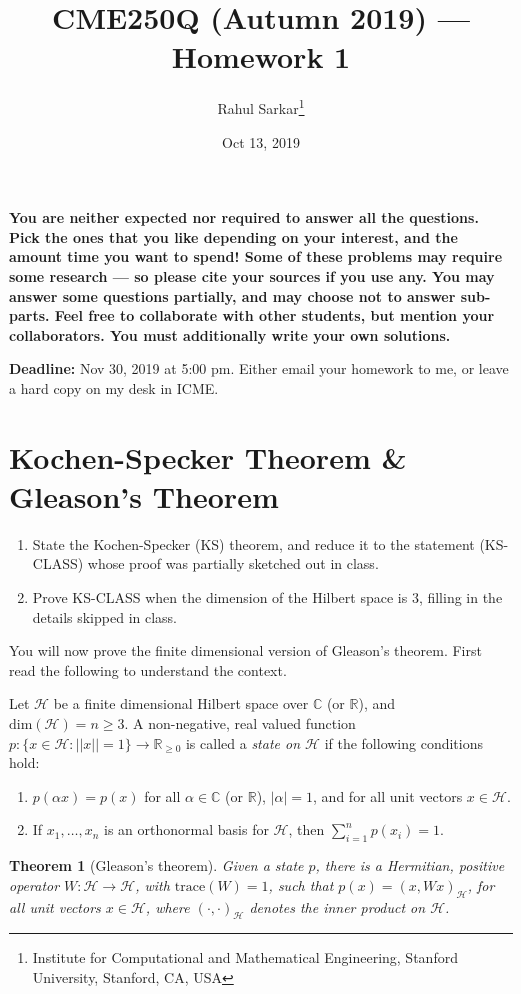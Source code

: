 \documentclass[10pt]{article}
\title{CME250Q (Autumn 2019) --- Homework 1}
\author{Rahul Sarkar\footnote{Institute for Computational and Mathematical Engineering, Stanford University, Stanford, CA, USA}}
\date{Oct 13, 2019}
\newcounter{ex}
\theoremstyle{plain}
\newtheorem{theorem}{Theorem}[section]
\theoremstyle{definition}
\begin{document}
\maketitle

\textbf{You are neither expected nor required to answer all the questions. Pick the ones that you like depending on your interest, and the amount time you want to spend! Some of these problems may require some research --- so please cite your sources if you use any. You may answer some questions partially, and may choose not to answer sub-parts. Feel free to collaborate with other students, but mention your collaborators. You must additionally write your own solutions.}

\textbf{Deadline:} Nov 30, 2019 at 5:00 pm. Either email your homework to me, or leave a hard copy on my desk in ICME.

\section{Kochen-Specker Theorem \& Gleason's Theorem}
\begin{enumerate}[label=(\alph*)]
\item State the Kochen-Specker (KS) theorem, and reduce it to the statement (KS-CLASS) whose proof was partially sketched out in class.
\item Prove KS-CLASS when the dimension of the Hilbert space is $3$, filling in the details skipped in class.
\end{enumerate}

You will now prove the finite dimensional version of Gleason's theorem. First read the following to understand the context.

Let $\mathcal{H}$ be a finite dimensional Hilbert space over $\mathbb{C}$ (or $\mathbb{R}$), and $\text{dim}(\mathcal{H}) = n \geq 3$. A non-negative, real valued function $p : \{x \in \mathcal{H}: ||x|| = 1\} \rightarrow \mathbb{R}_{\geq 0}$ is called a \textit{state on $\mathcal{H}$} if the following conditions hold:
\begin{enumerate}[label=(\roman*)]
\item $p(\alpha x) = p(x)$ for all $\alpha \in \mathbb{C}$ (or $\mathbb{R}$), $|\alpha| = 1$, and for all unit vectors $x \in \mathcal{H}$.
\item If $x_1,\dots,x_n$ is an orthonormal basis for $\mathcal{H}$, then $\sum_{i=1}^{n} p(x_i) = 1$.
\end{enumerate}

\begin{theorem}[Gleason's theorem]
Given a state $p$, there is a Hermitian, positive operator $W : \mathcal{H} \rightarrow \mathcal{H}$, with $\text{trace}(W) = 1$, such that $p(x) = (x, Wx)_{\mathcal{H}}$, for all unit vectors $x \in \mathcal{H}$, where $(\cdot,\cdot)_{\mathcal{H}}$ denotes the inner product on $\mathcal{H}$.
\end{theorem}
\end{document}
